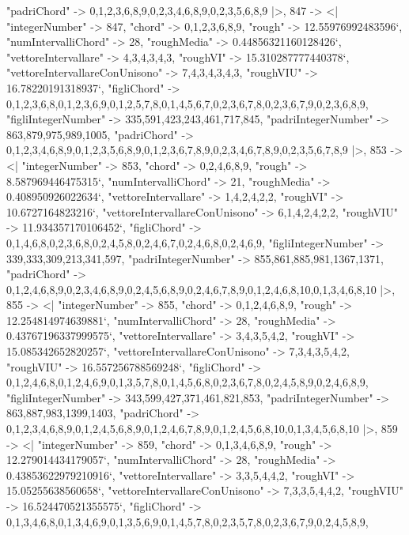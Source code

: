 \documentclass[
]{article}
\begin{document}
\begin{DatasetVerbatim}
    "padriChord" -> {{0,1,2,3,6,8,9},{0,2,3,4,6,8,9},{0,2,3,5,6,8,9}}
  |>,
  847 -> <|
    "integerNumber" -> 847,
    "chord" -> {0,1,2,3,6,8,9},
    "rough" -> 12.55976992483596`,
    "numIntervalliChord" -> 28,
    "roughMedia" -> 0.44856321160128426`,
    "vettoreIntervallare" -> {4,3,4,3,4,3},
    "roughVI" -> 15.310287777440378`,
    "vettoreIntervallareConUnisono" -> {7,4,3,4,3,4,3},
    "roughVIU" -> 16.78220191318937`,
    "figliChord" -> {{0,1,2,3,6,8},{0,1,2,3,6,9},{0,1,2,5,7,8},{0,1,4,5,6,7},{0,2,3,6,7,8},{0,2,3,6,7,9},{0,2,3,6,8,9}},
    "figliIntegerNumber" -> {335,591,423,243,461,717,845},
    "padriIntegerNumber" -> {863,879,975,989,1005},
    "padriChord" -> {{0,1,2,3,4,6,8,9},{0,1,2,3,5,6,8,9},{0,1,2,3,6,7,8,9},{0,2,3,4,6,7,8,9},{0,2,3,5,6,7,8,9}}
  |>,
  853 -> <|
    "integerNumber" -> 853,
    "chord" -> {0,2,4,6,8,9},
    "rough" -> 8.587969446475315`,
    "numIntervalliChord" -> 21,
    "roughMedia" -> 0.408950926022634`,
    "vettoreIntervallare" -> {1,4,2,4,2,2},
    "roughVI" -> 10.6727164823216`,
    "vettoreIntervallareConUnisono" -> {6,1,4,2,4,2,2},
    "roughVIU" -> 11.934357170106452`,
    "figliChord" -> {{0,1,4,6,8},{0,2,3,6,8},{0,2,4,5,8},{0,2,4,6,7},{0,2,4,6,8},{0,2,4,6,9}},
    "figliIntegerNumber" -> {339,333,309,213,341,597},
    "padriIntegerNumber" -> {855,861,885,981,1367,1371},
    "padriChord" -> {{0,1,2,4,6,8,9},{0,2,3,4,6,8,9},{0,2,4,5,6,8,9},{0,2,4,6,7,8,9},{0,1,2,4,6,8,10},{0,1,3,4,6,8,10}}
  |>,
  855 -> <|
    "integerNumber" -> 855,
    "chord" -> {0,1,2,4,6,8,9},
    "rough" -> 12.254814974639881`,
    "numIntervalliChord" -> 28,
    "roughMedia" -> 0.43767196337999575`,
    "vettoreIntervallare" -> {3,4,3,5,4,2},
    "roughVI" -> 15.085342652820257`,
    "vettoreIntervallareConUnisono" -> {7,3,4,3,5,4,2},
    "roughVIU" -> 16.557256788569248`,
    "figliChord" -> {{0,1,2,4,6,8},{0,1,2,4,6,9},{0,1,3,5,7,8},{0,1,4,5,6,8},{0,2,3,6,7,8},{0,2,4,5,8,9},{0,2,4,6,8,9}},
    "figliIntegerNumber" -> {343,599,427,371,461,821,853},
    "padriIntegerNumber" -> {863,887,983,1399,1403},
    "padriChord" -> {{0,1,2,3,4,6,8,9},{0,1,2,4,5,6,8,9},{0,1,2,4,6,7,8,9},{0,1,2,4,5,6,8,10},{0,1,3,4,5,6,8,10}}
  |>,
  859 -> <|
    "integerNumber" -> 859,
    "chord" -> {0,1,3,4,6,8,9},
    "rough" -> 12.279014434179057`,
    "numIntervalliChord" -> 28,
    "roughMedia" -> 0.43853622979210916`,
    "vettoreIntervallare" -> {3,3,5,4,4,2},
    "roughVI" -> 15.05255638560658`,
    "vettoreIntervallareConUnisono" -> {7,3,3,5,4,4,2},
    "roughVIU" -> 16.524470521355575`,
    "figliChord" -> {{0,1,3,4,6,8},{0,1,3,4,6,9},{0,1,3,5,6,9},{0,1,4,5,7,8},{0,2,3,5,7,8},{0,2,3,6,7,9},{0,2,4,5,8,9}},

\end{DatasetVerbatim}
\end{document}
